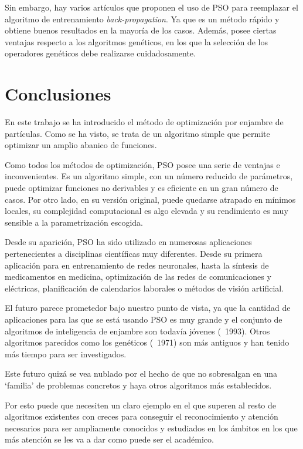 \documentclass[a4paper,12pt,titlepage]{article}
\begin{document}
Sin embargo, hay varios artículos que proponen el uso de PSO para reemplazar el algoritmo de entrenamiento \textit{back-propagation}. Ya que es un método rápido y obtiene buenos resultados en la mayoría de los casos. Además, posee ciertas ventajas respecto a los algoritmos genéticos, en los que la selección de los operadores genéticos debe realizarse cuidadosamente.

\section{Conclusiones}

En este trabajo se ha introducido el método de optimización por enjambre de partículas. Como se ha visto, se trata de un algoritmo simple que permite optimizar un amplio abanico de funciones.

Como todos los métodos de optimización, PSO posee una serie de ventajas e inconvenientes. Es un algoritmo simple, con un número reducido de parámetros, puede optimizar funciones no derivables y es eficiente en un gran número de casos. Por otro lado, en su versión original, puede quedarse atrapado en mínimos locales, su complejidad computacional es algo elevada y su rendimiento es muy sensible a la parametrización escogida.

Desde su aparición, PSO ha sido utilizado en numerosas aplicaciones pertenecientes a disciplinas científicas muy diferentes. Desde su primera aplicación para en entrenamiento de redes neuronales, hasta la síntesis de medicamentos en medicina, optimización de las redes de comunicaciones y eléctricas, planificación de calendarios laborales o métodos de visión artificial. 

El futuro parece prometedor bajo nuestro punto de vista, ya que la cantidad de aplicaciones para las que se está usando PSO es muy grande y el conjunto de algoritmos de inteligencia de enjambre son todavía jóvenes (~1993). Otros algoritmos parecidos como los genéticos (~1971) son más antiguos y han tenido más tiempo para ser investigados.

Este futuro quizá se vea nublado por el hecho de que no sobresalgan en una ‘familia’ de problemas concretos y haya otros algoritmos más establecidos.

Por esto puede que  necesiten un claro ejemplo en el que superen al resto de algoritmos existentes con creces para conseguir el reconocimiento y atención necesarios para ser ampliamente conocidos y estudiados en los ámbitos en los que más atención se les va a dar como puede ser el académico.
\end{document}
